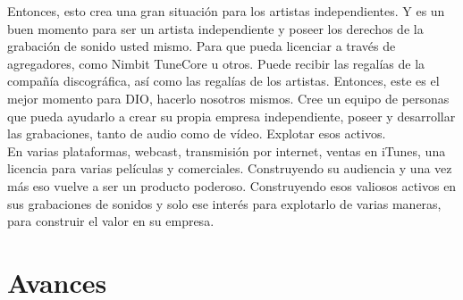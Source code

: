 \documentclass[10pt]{book}
\begin{document}
Entonces, esto crea una gran situación para los artistas independientes. Y es un buen momento para ser un artista independiente y poseer los derechos de la grabación de sonido usted mismo. {\color{red}Para que pueda licenciar a través de agregadores, como Nimbit TuneCore u otros. Puede recibir las regalías de la compañía discográfica, así como las regalías de los artistas. Entonces, este es el mejor momento para DIO, hacerlo nosotros mismos. Cree un equipo de personas que pueda ayudarlo a crear su propia empresa independiente, poseer y desarrollar las grabaciones, tanto de audio como de vídeo. Explotar esos activos.}\\
En varias plataformas, webcast, transmisión por internet, ventas en iTunes, una licencia para varias películas y comerciales. Construyendo su audiencia y una vez más eso vuelve a ser un producto poderoso. Construyendo esos valiosos activos en sus grabaciones de sonidos y solo ese interés para explotarlo de varias maneras, para construir el valor en su empresa.
\section{Avances}
\end{document}
